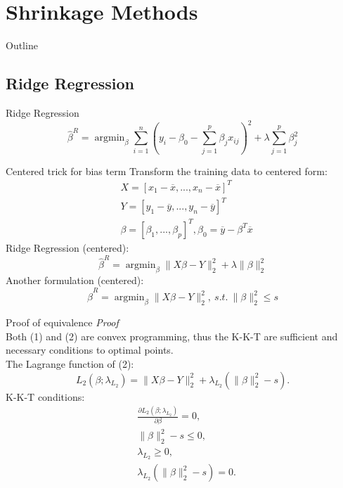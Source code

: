 \documentclass{beamer}
\begin{document}
	\section{Shrinkage Methods}
	\begin{frame}{Outline}
		\tableofcontents[currentsection]
	\end{frame}

	\subsection{Ridge Regression}
	\begin{frame}{Ridge Regression}
		\[
		\hat{\beta}^R = \mathop{\arg\min}_{\beta} \sum_{i=1}^{n} (y_i-\beta_0-\sum_{j=1}^{p} \beta_jx_{ij})^2+\lambda\sum_{j=1}^{p}\beta_j^2
		\]
	\end{frame}
	
	\begin{frame}{Centered trick for bias term}
		Transform the training data to centered form:
		\begin{align*}
			&X=[x_1-\overline{x},...,x_n-\overline{x}]^T \\
			&Y=[y_1-\overline{y}, ..., y_n-\overline{y}]^T \\
			&\beta=[\beta_1, ..., \beta_p]^T, \beta_0=\overline{y}-\beta^T\overline{x}
		\end{align*}
		Ridge Regression (centered):
		\begin{equation}
			\hat{\beta}^R = \mathop{\arg\min}_{\beta} \|X\beta-Y\|_2^2 + \lambda \|\beta\|_2^2
		\end{equation}
		Another formulation (centered):
		\begin{equation}
			\hat{\beta}^R = \mathop{\arg\min}_{\beta} \|X\beta-Y\|_2^2,\ s.t.\ \|\beta\|_2^2 \leq s
		\end{equation}
	\end{frame}
	
	\begin{frame}{Proof of equivalence}
		\textit{Proof} \\
		Both (1) and (2) are convex programming, thus the K-K-T are sufficient and necessary conditions to optimal points. \\
		The Lagrange function of (2):
		\[
		L_2(\beta;\lambda_{L_2})=\|X\beta-Y\|_2^2+\lambda_{L_2}(\|\beta\|_2^2-s).
		\]
		K-K-T conditions:
		\begin{align*}
			&\frac{\partial L_2(\beta;\lambda_{L_2})}{\partial \beta}=0, \\
			&\|\beta\|_2^2-s \leq 0, \\
			&\lambda_{L_2} \geq 0, \\
			&\lambda_{L_2}(\|\beta\|_2^2-s)=0.
		\end{align*}
	\end{frame}
	
\end{document}
